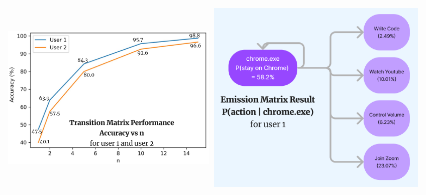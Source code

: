 \documentclass[final]{beamer}
\newlength{\colwidth}
\begin{document}
\begin{frame}[t]
\begin{columns}[t]
\begin{column}{\colwidth}
\begin{block}
      \begin{figure}
        \includegraphics[width=0.475\textwidth, height=15cm]{transition-mt.jpeg}
        \hspace{\fill}
        \includegraphics[width=0.48\textwidth, height=15cm]{emission-mt.jpeg}
        \end{figure}


\end{block}
\end{column}
\end{columns}
\end{frame}
\end{document}
